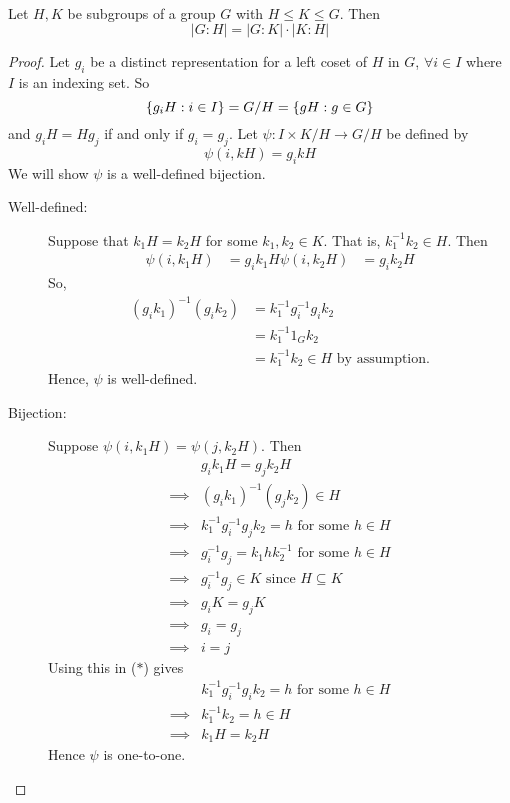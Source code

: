\begin{theorem} \leavevmode \\
    Let $H,K$ be subgroups of a group $G$ with $H \leq K \leq G$. Then 
    $$|G:H| = |G:K| \cdot |K:H|$$
\end{theorem}

\begin{proof}
    Let $g_i$ be a distinct representation for a left coset of $H$ in $G$, $\forall i \in I$ where $I$ is an indexing set. So 
    $$\left\{g_iH : i \in I\right\} = G/H = \left\{gH : g \in G\right\}$$
    and $g_iH = Hg_j$ if and only if $g_i = g_j$. Let $\psi: I \times K / H \to G / H$ be defined by 
    $$\psi(i, kH) = g_ikH$$
    We will show $\psi$ is a well-defined bijection.

    \begin{description}
        \item[Well-defined: ] Suppose that $k_1H = k_2H$ for some $k_1, k_2 \in K.$ That is, $k_1^{-1}k_2 \in H$. Then 
        \begin{align*}
            \psi(i, k_1H) &= g_ik_1H
            \psi(i, k_2H) &= g_ik_2H
        \end{align*}
        So,
        \begin{align*}
            (g_ik_1)^{-1}(g_ik_2) &= k_1^{-1}g_i^{-1}g_ik_2 \\
            &= k_1^{-1}1_Gk_2 \\
            &= k_1^{-1}k_2 \in H \text{ by assumption.}
        \end{align*}
        Hence, $\psi$ is well-defined.

        \item[Bijection: ] Suppose $\psi(i, k_1H) = \psi(j, k_2H)$. Then 
        \begin{align*}
            &g_ik_1H = g_jk_2H \\
            \implies &(g_ik_1)^{-1}(g_jk_2) \in H \\
            \implies &k_1^{-1}g_i^{-1}g_jk_2 = h \text{ for some } h \in H \tag{$*$} \\
            \implies &g_i^{-1}g_j = k_1hk_2^{-1} \text{ for some } h \in H \\
            \implies &g_i^{-1}g_j \in K \text{ since } H\subseteq K \\ 
            \implies &g_iK = g_jK \\
            \implies &g_i = g_j \\
            \implies &i = j
        \end{align*}
        Using this in ($*$) gives
        \begin{align*}
            &k_1^{-1}g_i^{-1}g_ik_2 = h \text{ for some } h \in H \\
            \implies &k_1^{-1}k_2 = h \in H \\
            \implies &k_1H = k_2H
        \end{align*}
        Hence $\psi$ is one-to-one.


\end{description}
\end{proof}
